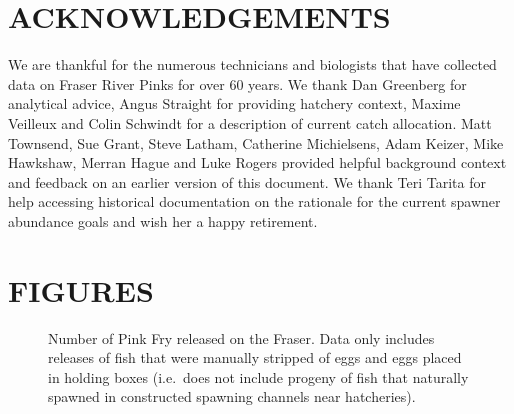 \documentclass[11pt]{book}
\begin{document}
\hypertarget{acknowledgements}{%
\section{ACKNOWLEDGEMENTS}\label{acknowledgements}}

We are thankful for the numerous technicians and biologists that have collected data on Fraser River Pinks for over 60 years. We thank Dan Greenberg for analytical advice, Angus Straight for providing hatchery context, Maxime Veilleux and Colin Schwindt for a description of current catch allocation. Matt Townsend, Sue Grant, Steve Latham, Catherine Michielsens, Adam Keizer, Mike Hawkshaw, Merran Hague and Luke Rogers provided helpful background context and feedback on an earlier version of this document. We thank Teri Tarita for help accessing historical documentation on the rationale for the current spawner abundance goals and wish her a happy retirement.

\hypertarget{figures}{%
\section{FIGURES}\label{figures}}


\begin{figure}[htb]

{\centering {} 

}

\caption{Number of Pink Fry released on the Fraser. Data only includes releases of fish that were manually stripped of eggs and eggs placed in holding boxes (i.e.~does not include progeny of fish that naturally spawned in constructed spawning channels near hatcheries).}\label{fig:fig-hatch-cont}
\end{figure}
\end{document}
